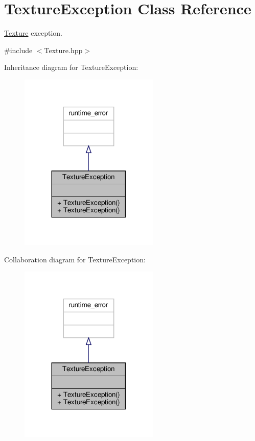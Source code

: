 \hypertarget{class_texture_exception}{}\section{Texture\+Exception Class Reference}
\label{class_texture_exception}


\hyperlink{struct_texture}{Texture} exception.  




{\ttfamily \#include $<$Texture.\+hpp$>$}



Inheritance diagram for Texture\+Exception\+:
\nopagebreak
\begin{figure}[H]
\begin{center}
\leavevmode
\includegraphics[width=188pt]{class_texture_exception__inherit__graph}
\end{center}
\end{figure}


Collaboration diagram for Texture\+Exception\+:
\nopagebreak
\begin{figure}[H]
\begin{center}
\leavevmode
\includegraphics[width=188pt]{class_texture_exception__coll__graph}
\end{center}
\end{figure}
